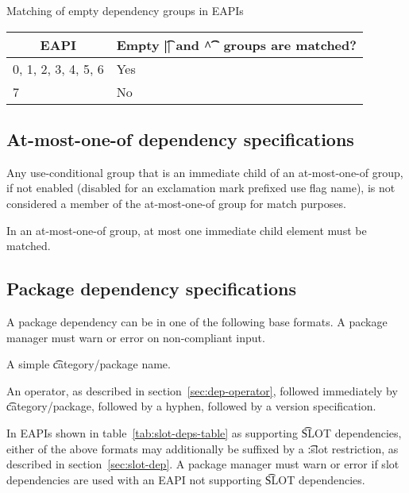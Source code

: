 \begin{centertable}{Matching of empty dependency groups in EAPIs}
    \label{tab:empty-dep-groups}
    \begin{tabular}{ll}
      \toprule
      \multicolumn{1}{c}{\textbf{EAPI}} &
      \multicolumn{1}{c}{\textbf{Empty \t{||} and \t{\textasciicircum\textasciicircum} groups
        are matched?}} \\
      \midrule
      0, 1, 2, 3, 4, 5, 6 & Yes \\
      7                   & No  \\
      \bottomrule
    \end{tabular}
\end{centertable}

\subsection{At-most-one-of dependency specifications}

Any use-conditional group that is an immediate child of an at-most-one-of group, if not enabled
(disabled for an exclamation mark prefixed use flag name), is not considered a member of the
at-most-one-of group for match purposes.

In an at-most-one-of group, at most one immediate child element must be matched.

\subsection{Package dependency specifications}

A package dependency can be in one of the following base formats. A package manager must warn or
error on non-compliant input.

\begin{compactitem}
\item A simple \t{category/package} name.
\item An operator, as described in section~\ref{sec:dep-operator}, followed immediately by
    \t{category/package}, followed by a hyphen, followed by a version specification.
\end{compactitem}

In EAPIs shown in table~\ref{tab:slot-deps-table} as supporting \t{SLOT} dependencies, either of the
above formats may additionally be suffixed by a \t{:slot} restriction, as described in
section~\ref{sec:slot-dep}. A package manager must warn or error if slot dependencies are used with an
EAPI not supporting \t{SLOT} dependencies.

